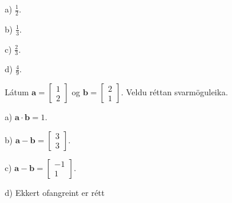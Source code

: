 a) $ \frac{1}{2}$.

b) $ \frac{1}{3}$.

c) $ \frac{2}{3}$. %

d) $ \frac{4}{9}$.


\item Látum $ \mathbf{a} =
\left[
\begin{matrix}
1\\
2
\end{matrix}
\right]
$
og
$
\mathbf{b} =
\left[
\begin{matrix}
2\\
1
\end{matrix}
\right]
$.
Veldu réttan svarmöguleika.

a) $ \mathbf{a} \cdot \mathbf{b} = 1$.

b) $ \mathbf{a} - \mathbf{b} = \left[  \begin{matrix} 3 \\ 3 \end{matrix} \right] $.

c) $ \mathbf{a} - \mathbf{b} = \left[  \begin{matrix} -1\\ 1 \end{matrix} \right] $. %

d) Ekkert ofangreint er rétt


